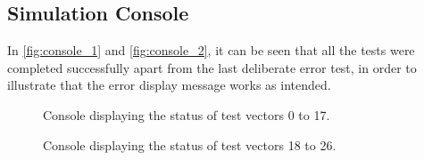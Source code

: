 \documentclass[10pt]{article}
\begin{document}
\subsection{Simulation Console}
In \autoref{fig:console_1} and \autoref{fig:console_2}, it can be seen that all the tests were completed successfully apart from the last deliberate error test, in order to illustrate that the error display message works as intended. 
\begin{figure}[ht]
    \centering
    \caption{Console displaying the status of test vectors 0 to 17.}
    \label{fig:console_1}    
\end{figure}

\newpage

\begin{figure}[ht]
    \centering
    \caption{Console displaying the status of test vectors 18 to 26.}
    \label{fig:console_2}    
\end{figure}
\newpage
\end{document}
